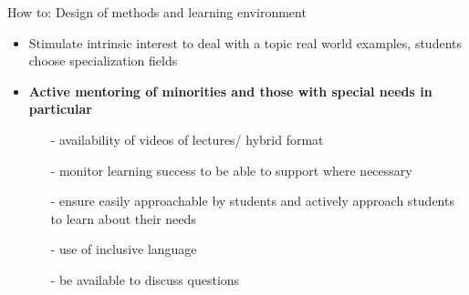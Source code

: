 \begin{frame}{How to: Design of methods and learning environment} %
	\begin{itemize}
		\item<+-> Stimulate intrinsic interest to deal with a topic \ar real world examples, students choose specialization fields
		\item<+-> \textbf{Active mentoring of minorities and those with special needs in particular}
		\begin{itemize}[<+->]
			\item[-] availability of videos of lectures/ hybrid format
			\item[-] monitor learning success to be able to support where necessary
			\item[-] ensure easily approachable by students and actively approach students to learn about their needs
			\item[-] use of inclusive language
			\item[-] be available to discuss questions
		\end{itemize}
		
	\end{itemize}
\end{frame}

